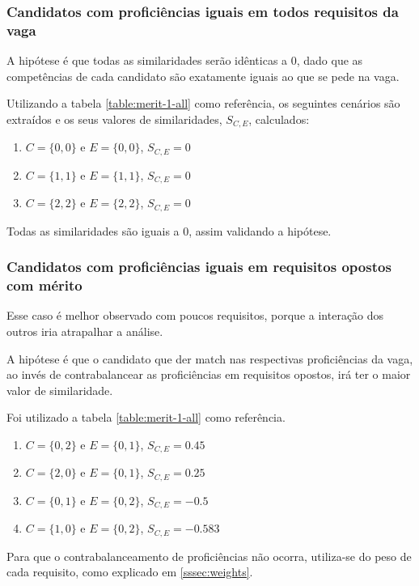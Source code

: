 \documentclass[preprint,12pt]{elsarticle}
\begin{document}
\subsubsection{Candidatos com proficiências iguais em todos requisitos da vaga}

A hipótese é que todas as similaridades serão idênticas a 0, dado que as competências de cada candidato são exatamente iguais ao que se pede na vaga. 

Utilizando a tabela \ref{table:merit-1-all} como referência, os seguintes cenários são extraídos e os seus valores de similaridades, $S_{C, E}$, calculados:

\begin{enumerate}
    \item $C = \{0,0\}$ e $E = \{0,0\}$, $S_{C,E} = 0$
    \item $C = \{1,1\}$ e $E = \{1,1\}$, $S_{C,E} = 0$
    \item $C = \{2,2\}$ e $E = \{2,2\}$, $S_{C,E} = 0$
\end{enumerate}

Todas as similaridades são iguais a 0, assim validando a hipótese.

\subsubsection{Candidatos com proficiências iguais em requisitos opostos com mérito}

Esse caso é melhor observado com poucos requisitos, porque a interação dos outros iria atrapalhar a análise.

A hipótese é que o candidato que der match nas respectivas proficiências da vaga, ao invés de contrabalancear as proficiências em requisitos opostos, irá ter o maior valor de similaridade.

Foi utilizado a tabela \ref{table:merit-1-all} como referência.

\begin{enumerate}
    \item $C = \{0,2\}$ e $E = \{0,1\}$, $S_{C,E} = 0.45$
    \item $C = \{2,0\}$ e $E = \{0,1\}$, $S_{C,E} = 0.25$
    \item $C = \{0,1\}$ e $E = \{0,2\}$, $S_{C,E} = -0.5$
    \item $C = \{1,0\}$ e $E = \{0,2\}$, $S_{C,E} = -0.583$
\end{enumerate}

Para que o contrabalanceamento de proficiências não ocorra, utiliza-se do peso de cada requisito, como explicado em \ref{sssec:weights}.
\end{document}
